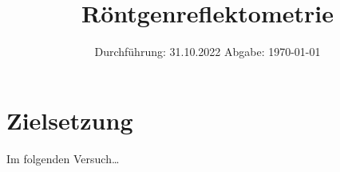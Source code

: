

\subject{V44}
\title{Röntgenreflektometrie}
\date{
    Durchführung: 31.10.2022
     \hspace{3em}
    Abgabe: \today %
}


\maketitle
\thispagestyle{empty}
\tableofcontents
\newpage

\section{Zielsetzung}

    Im folgenden Versuch… %


\clearpage


\clearpage


\clearpage


\clearpage

\printbibliography



